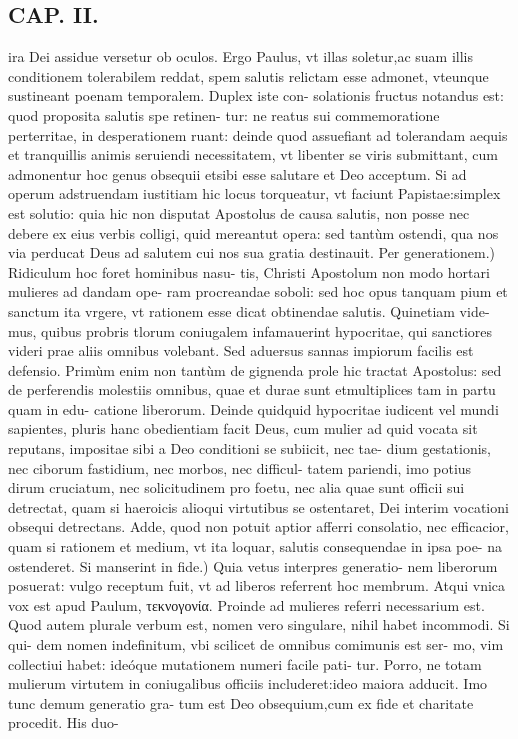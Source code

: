 \documentclass{article}
\begin{document}
\begin{pages}
\section*{CAP. II. }
\marginpar{[ p.29 ]}\pstart ira Dei assidue versetur ob oculos. Ergo Paulus, vt illas soletur,ac suam illis conditionem tolerabilem reddat, spem salutis relictam esse admonet, vteunque sustineant poenam temporalem. Duplex iste con- solationis fructus notandus est: quod proposita salutis spe retinen- tur: ne reatus sui commemoratione perterritae, in desperationem ruant: deinde quod assuefiant ad tolerandam aequis et tranquillis animis seruiendi necessitatem, vt libenter se viris submittant, cum admonentur hoc genus obsequii etsibi esse salutare et Deo acceptum. Si ad operum adstruendam iustitiam hic locus torqueatur, vt faciunt Papistae:simplex est solutio: quia hic non disputat Apostolus de causa salutis, non posse nec debere ex eius verbis colligi, quid mereantut opera: sed tantùm ostendi, qua nos via perducat Deus ad salutem cui nos sua gratia destinauit.  \pend\pstart Per generationem.) Ridiculum hoc foret hominibus nasu- tis, Christi Apostolum non modo hortari mulieres ad dandam ope- ram procreandae soboli: sed hoc opus tanquam pium et sanctum ita vrgere, vt rationem esse dicat obtinendae salutis. Quinetiam vide- mus, quibus probris tlorum coniugalem infamauerint hypocritae, qui sanctiores videri prae aliis omnibus volebant. Sed aduersus sannas impiorum facilis est defensio. Primùm enim non tantùm de gignenda prole hic tractat Apostolus: sed de perferendis molestiis omnibus, quae et durae sunt etmultiplices tam in partu quam in edu- catione liberorum. Deinde quidquid hypocritae iudicent vel mundi sapientes, pluris hanc obedientiam facit Deus, cum mulier ad quid vocata sit reputans, impositae sibi a Deo conditioni se subiicit, nec tae- dium gestationis, nec ciborum fastidium, nec morbos, nec difficul- tatem pariendi, imo potius dirum cruciatum, nec solicitudinem pro foetu, nec alia quae sunt officii sui detrectat, quam si haeroicis alioqui virtutibus se ostentaret, Dei interim vocationi obsequi detrectans. Adde, quod non potuit aptior afferri consolatio, nec efficacior, quam si rationem et medium, vt ita loquar, salutis consequendae in ipsa poe- na ostenderet.  \pend\pstart Si manserint in fide.) Quia vetus interpres generatio- nem liberorum posuerat: vulgo receptum fuit, vt ad liberos referrent hoc membrum. Atqui vnica vox est apud Paulum, τεκνογονία. Proinde ad mulieres referri necessarium est. Quod autem plurale verbum est, nomen vero singulare, nihil habet incommodi. Si qui- dem nomen indefinitum, vbi scilicet de omnibus comimunis est ser- mo, vim collectiui habet: ideóque mutationem numeri facile pati- tur. Porro, ne totam mulierum virtutem in coniugalibus officiis includeret:ideo maiora adducit. Imo tunc demum generatio gra- tum est Deo obsequium,cum ex fide et charitate procedit. His duo-  \pend

\end{pages}
\end{document}
